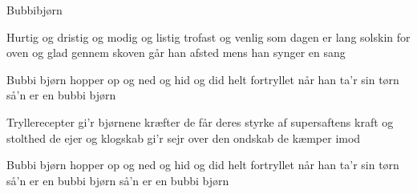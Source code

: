 \begin{sang}{Bubbibjørn}{}
\begin{vers}
Hurtig og dristig og modig og listig 
trofast og venlig som dagen er lang 
solskin for oven og glad gennem skoven 
går han afsted mens han synger en sang 
\end{vers}

\begin{omkvaed}
Bubbi bjørn
hopper op og ned og hid og did
helt fortryllet når han ta'r sin tørn 
så'n er en bubbi bjørn 
\end{omkvaed}
\vfill
\begin{vers}
Tryllerecepter gi'r bjørnene kræfter 
de får deres styrke af supersaftens kraft 
og stolthed de ejer og klogskab gi'r sejr 
over den ondskab de kæmper imod 
\end{vers}

\begin{omkvaed}[b]
Bubbi bjørn 
hopper op og ned og hid og did 
helt fortryllet når han ta'r sin tørn 
så'n er en bubbi bjørn 
så'n er en bubbi bjørn 
\end{omkvaed}
\laps
\end{sang}